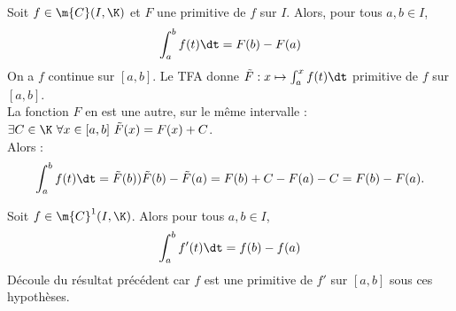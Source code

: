 \documentclass[11pt]{article}
\begin{document}
\begin{prop}{}{}
    Soit $f\in\m{C}(I,\K)$ et $F$ une primitive de $f$ sur $I$. Alors, pour tous $a,b\in I$,
    \begin{equation*}
        \int_a^bf(t)\dt=F(b)-F(a)
    \end{equation*}
    \tcblower
    On a $f$ continue sur $[a,b]$. Le TFA donne $\tilde{F}:x\mapsto\int_a^xf(t)\dt$ primitive de $f$ sur $[a,b]$.\\
    La fonction $F$ en est une autre, sur le même intervalle : $\exists C\in\K ~ \forall x \in [a,b] ~ \tilde{F}(x)=F(x)+C$.\\
    Alors :
    \begin{equation*}
        \int_a^bf(t)\dt=\tilde{F}(b))\tilde{F}(b)-\tilde{F}(a)=F(b)+C-F(a)-C=F(b)-F(a).
    \end{equation*}
\end{prop}

\begin{prop}{}{}
    Soit $f\in\m{C}^1(I,\K)$. Alors pour tous $a,b\in I$,
    \begin{equation*}
        \int_a^bf'(t)\dt=f(b)-f(a)
    \end{equation*}
    \tcblower
    Découle du résultat précédent car $f$ est une primitive de $f'$ sur $[a,b]$ sous ces hypothèses.
\end{prop}
\end{document}
